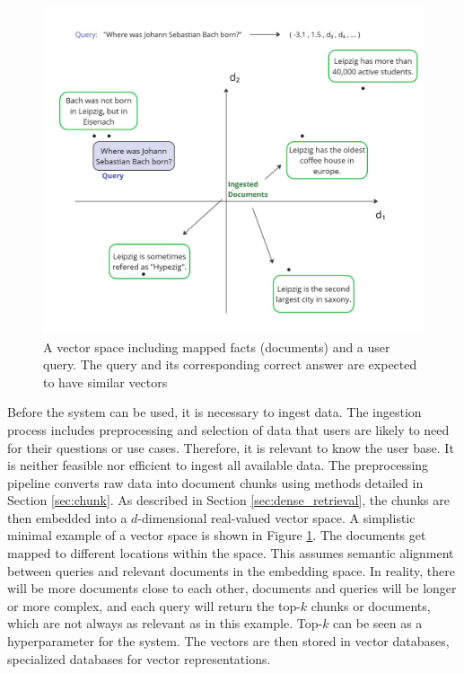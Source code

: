 \begin{figure}[h!]
    \centering
    \includegraphics[width=\textwidth]{images/VectorDB.pdf}
    \caption{A vector space including mapped facts (documents) and a user query. The query and its corresponding correct answer are expected to have similar vectors}
    \label{fig:vectorDB}
\end{figure}


Before the system can be used, it is necessary to ingest data. The ingestion process includes preprocessing and selection of data that users are likely to need for their questions or use cases. Therefore, it is relevant to know the user base. It is neither feasible nor efficient to ingest all available data. The preprocessing pipeline converts raw data into document chunks using methods detailed in Section \ref{sec:chunk}. As described in Section \ref{sec:dense_retrieval}, the chunks are then embedded into a $d$-dimensional real-valued vector space. A simplistic minimal example of a vector space is shown in Figure \ref{fig:vectorDB}. The documents get mapped to different locations within the space. This assumes semantic alignment between queries and relevant documents in the embedding space. In reality, there will be more documents close to each other, documents and queries will be longer or more complex, and each query will return the top-$k$ chunks or documents, which are not always as relevant as in this example. Top-$k$ can be seen as a hyperparameter for the system. The vectors are then stored in vector databases, specialized databases for vector representations.


